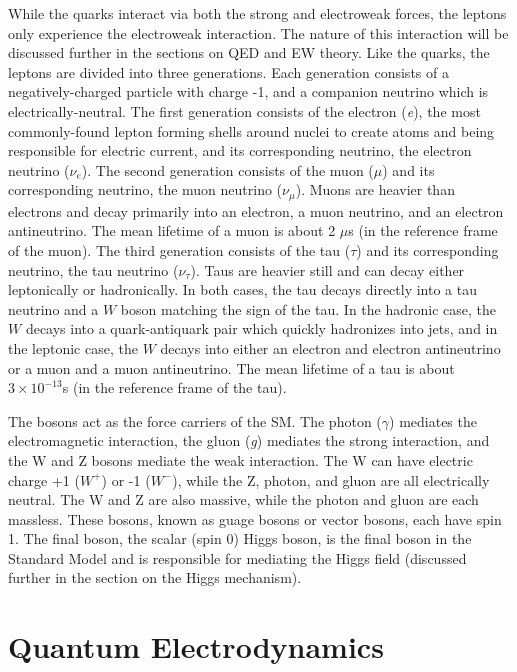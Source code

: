 While the quarks interact via both the strong and electroweak forces, the leptons only experience the electroweak interaction. The nature of this interaction will be discussed further in the sections on QED and EW theory. Like the quarks, the leptons are divided into three generations. Each generation consists of a negatively-charged particle with charge -1, and a companion neutrino which is electrically-neutral. The first generation consists of the electron (\textit{e}), the most commonly-found lepton forming shells around nuclei to create atoms and being responsible for electric current, and its corresponding neutrino, the electron neutrino (\textit{$\nu_{e}$}). The second generation consists of the muon (\textit{$\mu$}) and its corresponding neutrino, the muon neutrino (\textit{$\nu_{\mu}$}). Muons are heavier than electrons and decay primarily into an electron, a muon neutrino, and an electron antineutrino. The mean lifetime of a muon is about 2 $\mu$s (in the reference frame of the muon). The third generation consists of the tau (\textit{$\tau$}) and its corresponding neutrino, the tau neutrino (\textit{$\nu_{\tau}$}). Taus are heavier still and can decay either leptonically or hadronically. In both cases, the tau decays directly into a tau neutrino and a $W$ boson matching the sign of the tau. In the hadronic case, the $W$ decays into a quark-antiquark pair which quickly hadronizes into jets, and in the leptonic case, the $W$ decays into either an electron and electron antineutrino or a muon and a muon antineutrino.  The mean lifetime of a tau is about $3 \times 10^{-13}$s (in the reference frame of the tau).\cite{pdg}

The bosons act as the force carriers of the SM. The photon (\textit{$\gamma$}) mediates the electromagnetic interaction, the gluon (\textit{g}) mediates the strong interaction, and the W and Z bosons mediate the weak interaction. The W can have electric charge +1 (\textit{$W^{+}$}) or -1 (\textit{$W^{-}$}), while the Z, photon, and gluon are all electrically neutral. The W and Z are also massive, while the photon and gluon are each massless. These bosons, known as guage bosons or vector bosons, each have spin 1. The final boson, the scalar (spin 0) Higgs boson, is the final boson in the Standard Model and is responsible for mediating the Higgs field (discussed further in the section on the Higgs mechanism).

\section{Quantum Electrodynamics}


